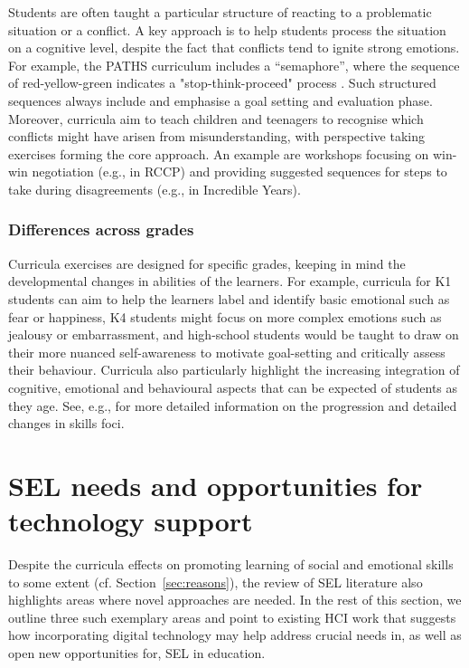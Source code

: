 \documentclass[prodmode,acmtochi]{acmsmall}
\begin{document}
Students are often taught a particular structure of reacting to a problematic situation or a conflict.
%
A key approach is to help students process the situation on a cognitive level, despite the fact that conflicts tend to ignite strong emotions. For example, the PATHS curriculum includes a ``semaphore'', where the sequence of red-yellow-green indicates a "stop-think-proceed" process \cite{Kam2004,Domitrovich2007}. Such structured sequences always include and emphasise a goal setting and evaluation phase. Moreover, curricula aim to teach children and teenagers to recognise which conflicts might have arisen from misunderstanding, with perspective taking exercises forming the core approach. An example are workshops focusing on win-win negotiation (e.g., in RCCP) and providing suggested sequences for steps to take during disagreements (e.g., in Incredible Years).




\subsubsection{Differences across grades}
\label{sec:ageDiff}
Curricula exercises are designed for specific grades, keeping in mind the developmental changes in abilities of the learners. For example, curricula for K1 students can aim to help the learners label and identify basic emotional such as fear or happiness, K4 students might focus on more complex emotions such as jealousy or embarrassment, and high-school students would be taught to draw on their more nuanced self-awareness to motivate goal-setting and critically assess their behaviour. Curricula also particularly highlight the increasing integration of cognitive, emotional and behavioural aspects that can be expected of students as they age. See, e.g.,  for more detailed information on the progression and detailed changes in skills foci. 







\section{SEL needs and opportunities for technology support}
\label{sec:HCIsupport}

Despite the curricula effects on promoting learning of social and emotional skills to some extent (cf. Section~\ref{sec:reasons}), the review of SEL literature also highlights areas where novel approaches are needed. In the rest of this section, we outline three such exemplary areas and point to existing HCI work that suggests how incorporating digital technology may help address crucial needs in, as well as open new opportunities for, SEL in education. 
\end{document}
